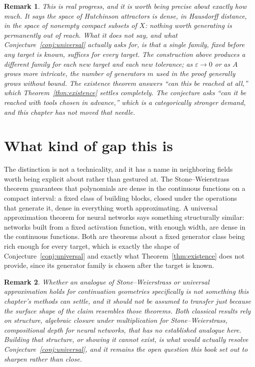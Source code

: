 \documentclass[11pt]{report}
\newtheorem{remark}{Remark}[chapter]
\begin{document}
\begin{remark}
This is real progress, and it is worth being precise about exactly
how much. It says the space of Hutchinson attractors is dense, in
Hausdorff distance, in the space of nonempty compact subsets of $X$:
nothing worth generating is permanently out of reach. What it does
not say, and what Conjecture~\ref{conj:universal} actually asks for,
is that a \emph{single} family, fixed before any target is known,
suffices for every target. The construction above produces a
different family for each new target and each new tolerance; as
$\varepsilon \to 0$ or as $A$ grows more intricate, the number of
generators $m$ used in the proof generally grows without bound. The
existence theorem answers ``can this be reached at all,'' which
Theorem~\ref{thm:existence} settles completely. The conjecture asks
``can it be reached with tools chosen in advance,'' which is a
categorically stronger demand, and this chapter has not moved that
needle.
\end{remark}

\section*{What kind of gap this is}

The distinction is not a technicality, and it has a name in
neighboring fields worth being explicit about rather than gestured at.
The Stone--Weierstrass theorem \cite{stone1948} guarantees that polynomials are dense
in the continuous functions on a compact interval: a fixed class of
building blocks, closed under the operations that generate it, dense
in everything worth approximating. A universal approximation theorem
for neural networks \cite{cybenko1989} says something structurally similar: networks
built from a fixed activation function, with enough width, are dense
in the continuous functions. Both are theorems about a fixed generator
class being rich enough for every target, which is exactly the shape
of Conjecture~\ref{conj:universal} and exactly what
Theorem~\ref{thm:existence} does not provide, since its generator
family is chosen after the target is known.

\begin{remark}
Whether an analogue of Stone--Weierstrass or universal approximation
holds for continuation geometries specifically is not something this
chapter's methods can settle, and it should not be assumed to transfer
just because the surface shape of the claim resembles those theorems.
Both classical results rely on structure, algebraic closure under
multiplication for Stone--Weierstrass, compositional depth for neural
networks, that has no established analogue here. Building that
structure, or showing it cannot exist, is what would actually resolve
Conjecture~\ref{conj:universal}, and it remains the open question this
book set out to sharpen rather than close.
\end{remark}
\end{document}

